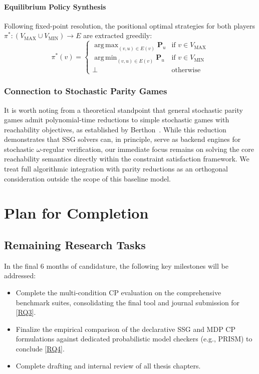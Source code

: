 \documentclass{article}
\begin{document}
\paragraph{Equilibrium Policy Synthesis}
Following fixed-point resolution, the positional optimal strategies for both players $\pi^* : (V_{\text{MAX}} \cup V_{\text{MIN}}) \to E$ are extracted greedily:
\begin{equation}
\pi^*(v) = 
\begin{cases}
\operatorname{arg\,max}_{(v, u) \in E(v)} \mathbf{P}_u & \text{if } v \in V_{\text{MAX}} \\
\operatorname{arg\,min}_{(v, u) \in E(v)} \mathbf{P}_u & \text{if } v \in V_{\text{MIN}} \\
\bot & \text{otherwise}
\end{cases}
\end{equation}

\subsubsection{Connection to Stochastic Parity Games}
It is worth noting from a theoretical standpoint that general stochastic parity games admit polynomial-time reductions to simple stochastic games with reachability objectives, as established by Berthon~\cite{Berthon:2017:reduction}. While this reduction demonstrates that SSG solvers can, in principle, serve as backend engines for stochastic $\omega$-regular verification, our immediate focus remains on solving the core reachability semantics directly within the constraint satisfaction framework. We treat full algorithmic integration with parity reductions as an orthogonal consideration outside the scope of this baseline model.


\section{Plan for Completion}

\subsection{Remaining Research Tasks}

In the final 6 months of candidature, the following key milestones will be addressed:
\begin{itemize}
    \item Complete the multi-condition CP evaluation on the comprehensive benchmark suites, consolidating the final tool and journal submission for [\hyperref[sec:rq]{RQ3}].
    \item Finalize the empirical comparison of the declarative SSG and MDP CP formulations against dedicated probabilistic model checkers (e.g., PRISM) to conclude [\hyperref[sec:rq]{RQ4}].
    \item Complete drafting and internal review of all thesis chapters.
\end{itemize}
\end{document}
